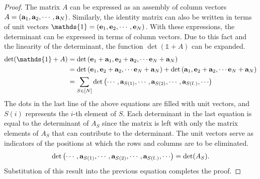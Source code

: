 \begin{proof}
    The matrix $A$ can be expressed as an assembly of column vectors $A = \left( \mathbf{a}_1, \mathbf{a}_2,\cdots, \mathbf{a}_{N} \right)$.
    Similarly, the identity matrix can also be written in terms of unit vectors $\mathds{1} = \lr{\bo{e}_1, \bo{e}_2,\cdots, \bo{e}_N}$. With these expressions, the determinant can be expressed in terms of column vectors. Due to this fact and the linearity of the determinant, the function $\det(\mathds{1} + A)$ can be expanded.
    \begin{align*}
        \det(\mathds{1} + A)
        &=
        \det\lr{
        \bo{e}_1 + \bo{a}_1, 
        \bo{e}_2 + \bo{a}_2, 
        \cdots
        \bo{e}_N + \bo{a}_N
        } \\
        &= 
        \det\lr{
        \bo{e}_1 , 
        \bo{e}_2 + \bo{a}_2, 
        \cdots
        \bo{e}_N + \bo{a}_N
        }
        +
        \det\lr{
        \bo{a}_1,
        \bo{e}_2 + \bo{a}_2, 
        \cdots
        \bo{e}_N + \bo{a}_N
        } \\
        &= 
        \sum_{S \in [N]}
        \det\lr{
        \cdots,
        \bo{a}_{S(1)},
        \cdots,
        \bo{a}_{S(2)},
        \cdots,
        \bo{a}_{S(\mrm{f.})},
        \cdots
        } 
    \end{align*}
    The dots in the last line of the above equations are filled with unit vectors, and $S(i)$ represents the $i$-th element of $S$. Each determinant in the last equation is equal to the determinant of $A_S$ since the matrix is left with only the matrix elements of $A_S$ that can contribute to the determinant. The unit vectors serve as indicators of the positions at which the rows and columns are to be eliminated.
    \[
    \det\lr{
    \cdots,
    \bo{a}_{S(1)},
    \cdots,
    \bo{a}_{S(2)},
    \cdots,
    \bo{a}_{S(\mrm{f.})},
    \cdots
    } 
    = \det(A_S).
    \]
    Substitution of this result into the previous equation completes the proof.
\end{proof}

